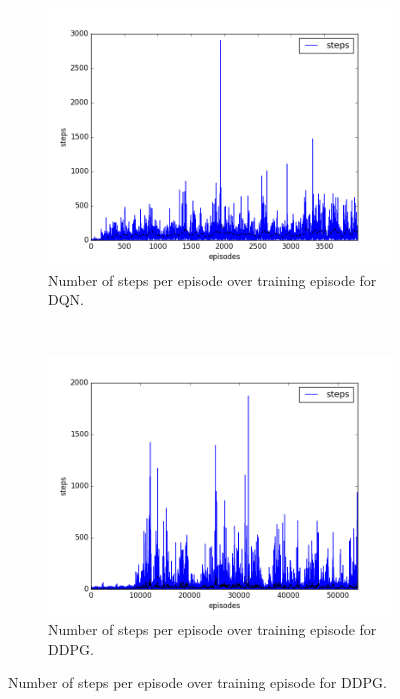 \begin{figure}[h]
  \centering

  \begin{subfigure}[h]{\figscale\linewidth}
    \includegraphics[trim=10 10 10 10,clip,width=\linewidth]
    {../results/dqn_2vs1/steps.png}
    \caption{Number of steps per episode over training episode for DQN.}
    \label{fig:dqn-2vs1-steps}
  \end{subfigure}
  ~
  \begin{subfigure}[h]{\figscale\linewidth}
    \includegraphics[trim=10 10 10 10,clip,width=\linewidth]
    {../results/ddpg_2vs1/steps.png}
    \caption{Number of steps per episode over training episode for DDPG.}
    \label{fig:ddpg-2vs1-steps}

\end{subfigure}
\end{figure}
